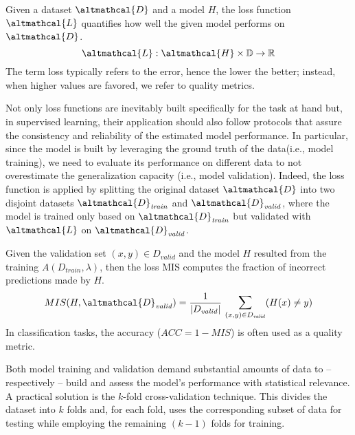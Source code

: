 \documentclass[a4paper,12pt,times,numbered,print,index]{Classes/PhDThesisPSnPDF}
\begin{document}
\begin{definition}\label{def:loss}
    Given a dataset $\altmathcal{D}$ and a model $H$, the loss function $\altmathcal{L}$ quantifies how well the given model performs on $\altmathcal{D}$.
    \begin{equation*}\label{eq:loss}
        \altmathcal{L}: \altmathcal{H} \times \mathbb{D} \rightarrow \mathbb{R}
    \end{equation*}
    The term loss typically refers to the error, hence the lower the better; instead, when higher values are favored, we refer to quality metrics.
\end{definition}

Not only loss functions are inevitably built specifically for the task at hand but, in supervised learning, their application should also follow protocols that assure the consistency and reliability of the estimated model performance.
In particular, since the model is built by leveraging the ground truth of the data(i.e., model training), we need to evaluate its performance on different data to not overestimate the generalization capacity (i.e., model validation).
Indeed, the loss function is applied by splitting the original dataset $\altmathcal{D}$ into two disjoint datasets $\altmathcal{D}_\mathit{train}$ and $\altmathcal{D}_\mathit{valid}$, where the model is trained only based on $\altmathcal{D}_\mathit{train}$ but validated with $\altmathcal{L}$ on $\altmathcal{D}_\mathit{valid}$.

\begin{example}
    Given the validation set $(x, y) \in D_\mathit{valid}$  and the model $H$ resulted from the training $A(D_\mathit{train}, \lambda)$, then the loss MIS computes the fraction of incorrect predictions made by $H$.
    \begin{equation*}
        MIS(H, \altmathcal{D}_\mathit{valid}) = \frac{1}{|D_\mathit{valid}|}~\mathlarger{\sum}_{(x, y) \in D_\mathit{valid}} (H(x) \ne y)
    \end{equation*}
    In classification tasks, the accuracy ($ACC = 1 - MIS$) is often used as a quality metric.
\end{example}

Both model training and validation demand substantial amounts of data to -- respectively -- build and assess the model's performance with statistical relevance.
A practical solution is the $k$-fold cross-validation technique.
This divides the dataset into $k$ folds and, for each fold, uses the corresponding subset of data for testing while employing the remaining $(k - 1)$ folds for training.
\end{document}
